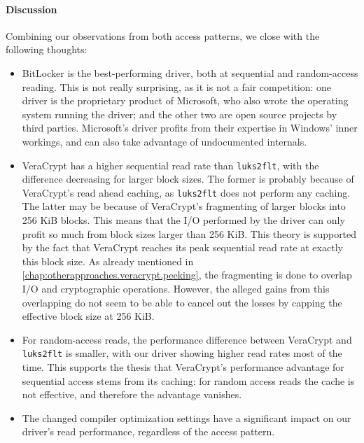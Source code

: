 \paragraph{Discussion}
Combining our observations from both access patterns, we close with the following thoughts:
\begin{itemize}[beginpenalty=10000]
	\item BitLocker is the best-performing driver, both at sequential and random-access reading. This is not really surprising, as it is not a fair competition: one driver is the proprietary product of Microsoft, who also wrote the operating system running the driver; and the other two are open source projects by third parties. Microsoft's driver profits from their expertise in Windows' inner workings, and can also take advantage of undocumented internals.
	\item VeraCrypt has a higher sequential read rate than \texttt{luks2flt}, with the difference decreasing for larger block sizes. The former is probably because of VeraCrypt's read ahead caching, as \texttt{luks2flt} does not perform any caching. The latter may be because of VeraCrypt's fragmenting of larger blocks into 256 KiB blocks. This means that the I/O performed by the driver can only profit so much from block sizes larger than 256 KiB. This theory is supported by the fact that VeraCrypt reaches its peak sequential read rate at exactly this block size. As already mentioned in \autoref{chap:otherapproaches.veracrypt.peeking}, the fragmenting is done to overlap I/O and cryptographic operations. However, the alleged gains from this overlapping do not seem to be able to cancel out the losses by capping the effective block size at 256 KiB.
	\item For random-access reads, the performance difference between VeraCrypt and \texttt{luks2flt} is smaller, with our driver showing higher read rates most of the time. This supports the thesis that VeraCrypt's performance advantage for sequential access stems from its caching: for random access reads the cache is not effective, and therefore the advantage vanishes.
	\item The changed compiler optimization settings have a significant impact on our driver's read performance, regardless of the access pattern.
\end{itemize}

